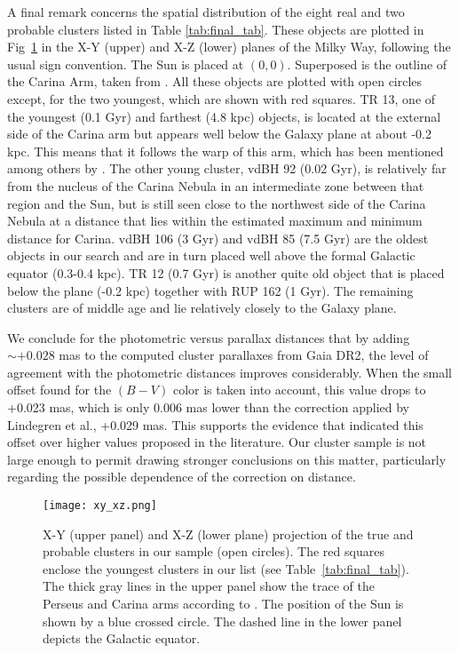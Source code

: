 \documentclass[draft]{aa}
\begin{document}
A final remark concerns the spatial distribution of the
eight real and two probable clusters listed in Table 
\ref{tab:final_tab}. These objects  are plotted in Fig~\ref{fig68} in the X-Y
(upper) and X-Z (lower) planes of the Milky Way, following the usual sign
convention. The Sun is placed at $(0, 0)$. Superposed is the outline of the
Carina Arm, taken from \cite{valle_2005}. All these objects are plotted with
open circles except, for the two youngest, which are shown with red squares. TR
13, one of the youngest (0.1 Gyr) and farthest (4.8 kpc) objects, is located at
the external side of the Carina arm but appears well below the Galaxy plane at
about -0.2 kpc. This means that it follows the warp of this arm, which has been
mentioned among others by \cite{Cersosimo_2009}.
The other young cluster, vdBH 92 (0.02 Gyr), is relatively far from the nucleus
of the Carina Nebula in an intermediate zone between that region and the Sun,
but is still seen close to the northwest side of the Carina Nebula at a
distance that lies within the estimated maximum and minimum distance for
Carina.
vdBH 106 (3 Gyr) and vdBH 85 (7.5 Gyr) are the oldest objects in our
search and are in turn placed well above the formal Galactic equator (0.3-0.4
kpc). TR 12 (0.7 Gyr) is another quite old object that is placed below the plane (-0.2
kpc) together with RUP 162 (1 Gyr). The remaining clusters are of middle age
and lie relatively closely to the Galaxy plane.

We conclude for the photometric versus parallax distances that by
adding $\sim+0.028$ mas to the computed cluster parallaxes from Gaia DR2,
the level of agreement with the photometric distances improves considerably.
When the small offset found for the $(B-V)$ color is taken into account, this
value drops to +0.023 mas, which is only 0.006 mas lower than the correction applied by
Lindegren et al., +0.029 mas.
This supports the evidence that indicated this offset over higher
values proposed in the literature. Our cluster sample is not large enough
to permit drawing stronger conclusions on this matter, particularly
regarding the possible dependence of the correction on distance.


\begin{figure}[ht]
    \centering
    \texttt{[image: xy\_xz.png]}
\caption{X-Y (upper panel) and X-Z (lower plane) projection of the true and
probable clusters in our sample (open circles). The red squares
enclose the youngest clusters in our list (see Table~\ref{tab:final_tab}).
The thick gray lines in the upper panel show the trace of the Perseus and
Carina arms according to \cite{valle_2005}.
The position of the Sun is shown by a blue crossed circle.
The dashed line in the lower panel depicts the Galactic equator.}
\label{fig68}
\end{figure}
\end{document}
